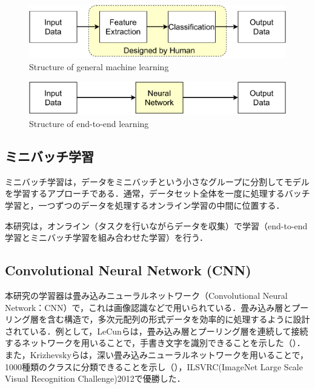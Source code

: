   \begin{figure}[h]
    \centering
    \includegraphics[keepaspectratio, scale=0.80] {images/pdf/RobotGuidance_about_general_structure}
    \caption{Structure of general machine learning}
    \label{Fig:Structure of general machine learning}
  \end{figure}

  \begin{figure}[h]
    \centering
    \includegraphics[keepaspectratio, scale=0.80] {images/pdf/RobotGuidance_about_end-to-end}
    \caption{Structure of end-to-end learning}
    \label{Fig:about_end-to-end}
  \end{figure}

\subsection{ミニバッチ学習}

  ミニバッチ学習は，データをミニバッチという小さなグループに分割してモデルを学習するアプローチである．通常，データセット全体を一度に処理するバッチ学習と，一つずつのデータを処理するオンライン学習の中間に位置する．

  \vspace{1cm}

  本研究は，オンライン（タスクを行いながらデータを収集）で学習（end-to-end学習とミニバッチ学習を組み合わせた学習）を行う．

\newpage

\subsection{Convolutional Neural Network (CNN)}

  本研究の学習器は畳み込みニューラルネットワーク（Convolutional Neural Network：CNN）で，これは画像認識などで用いられている\cite{yann1}\cite{alex}．畳み込み層とプーリング層を含む構造で，多次元配列の形式データを効率的に処理するように設計されている．例として，LeCunら\cite{yann1}は，畳み込み層とプーリング層を連続して接続するネットワークを用いることで，手書き文字を識別できることを示した（）．また，Krizhevskyら\cite{alex}は，深い畳み込みニューラルネットワークを用いることで，1000種類のクラスに分類できることを示し（），ILSVRC(ImageNet Large Scale Visual Recognition Challenge)2012で優勝した．

